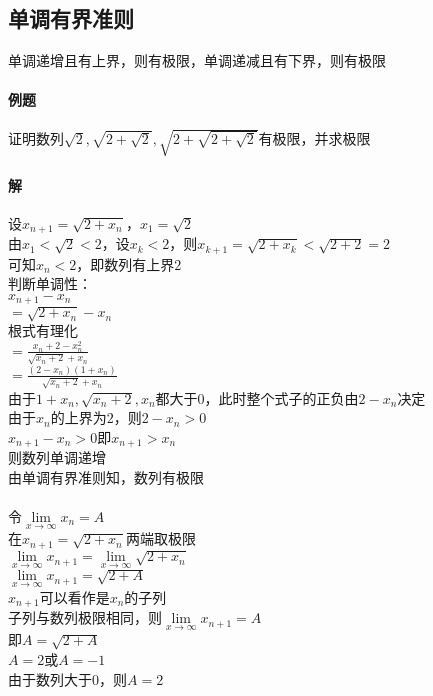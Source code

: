 \documentclass{article}
\begin{document}
\begin{flushleft}
	\subsection{单调有界准则}
	单调递增且有上界，则有极限，单调递减且有下界，则有极限\\
	
	\paragraph{例题}
	证明数列$\sqrt{2}, \sqrt{2+\sqrt{2}}, \sqrt{2+\sqrt{2+\sqrt{2}}}$有极限，并求极限
	\paragraph{解}
	设$x_{n+1}=\sqrt{2+x_n}$，$x_1=\sqrt{2}$\\
	由$x_1<\sqrt{2}<2$，设$x_k<2$，则$x_{k+1}=\sqrt{2+x_k}<\sqrt{2+2}=2$\\
	可知$x_n<2$，即数列有上界$2$\\
	判断单调性：\\
	$x_{n+1}-x_n$\\
	$=\sqrt{2+x_n}-x_n$\\
	根式有理化\\
	$=\frac{x_n+2-x_n^2}{\sqrt{x_n+2}+x_n}$\\
	$=\frac{(2-x_n)(1+x_n)}{\sqrt{x_n+2}+x_n}$\\
	由于$1+x_n, \sqrt{x_n+2}, x_n$都大于0，此时整个式子的正负由$2-x_n$决定\\
	由于$x_n$的上界为$2$，则$2-x_n>0$\\
	$x_{n+1}-x_n>0$即$x_{n+1}>x_n$\\
	则数列单调递增\\
	由单调有界准则知，数列有极限\\
	~\\
	令$\lim\limits_{x\to\infty}x_n=A$\\
	在$x_{n+1}=\sqrt{2+x_n}$两端取极限\\
	$\lim\limits_{x\to\infty}x_{n+1}=\lim\limits_{x\to\infty}\sqrt{2+x_n}$\\
	$\lim\limits_{x\to\infty}x_{n+1}=\sqrt{2+A}$\\
	$x_{n+1}$可以看作是$x_n$的子列\\
	子列与数列极限相同，则$\lim\limits_{x\to\infty}x_{n+1}=A$\\
	即$A=\sqrt{2+A}$\\
	$A=2$或$A=-1$\\
	由于数列大于0，则$A=2$\\
	

\end{flushleft}
\end{document}
